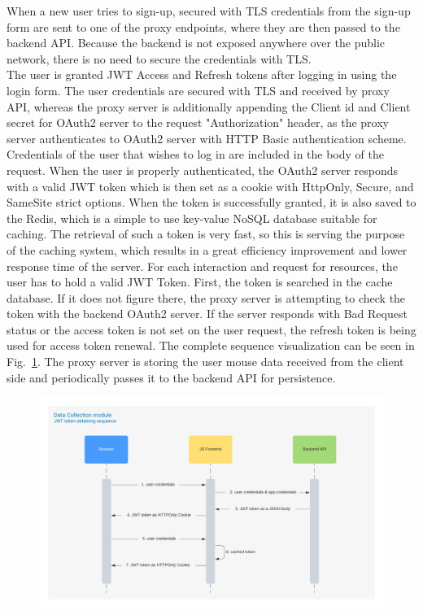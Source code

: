 When a new user tries to sign-up, secured with TLS credentials from the sign-up form are sent to one of the proxy endpoints, where they are then passed to the backend API.
Because the backend is not exposed anywhere over the public network, there is no need to secure the credentials with TLS.\\
The user is granted JWT Access and Refresh tokens after logging in using the login form.
The user credentials are secured with TLS and received by proxy API, whereas the proxy server is additionally appending the Client id and Client secret for OAuth2 server to the request "Authorization" header, as the proxy server authenticates to OAuth2 server with HTTP Basic authentication scheme.
Credentials of the user that wishes to log in are included in the body of the request.
When the user is properly authenticated, the OAuth2 server responds with a valid JWT token which is then set as a cookie with HttpOnly, Secure, and SameSite strict options.
When the token is successfully granted, it is also saved to the Redis, which is a simple to use key-value NoSQL database suitable for caching.
The retrieval of such a token is very fast, so this is serving the purpose of the caching system, which results in a great efficiency improvement and lower response time of the server.
For each interaction and request for resources, the user has to hold a valid JWT Token.
First, the token is searched in the cache database.
If it does not figure there, the proxy server is attempting to check the token with the backend OAuth2 server.
If the server responds with Bad Request status or the access token is not set on the user request, the refresh token is being used for access token renewal.
The complete sequence visualization can be seen in \mbox{Fig.~\ref{fig:jwt-sequence}}.
The proxy server is storing the user mouse data received from the client side and periodically passes it to the backend API for persistence.




\begin{figure}[!hbt]
    
    \centering
    \includegraphics[width=\linewidth]{resources/jwt_sequence_diagram.png}
    \captionsetup{width=\linewidth}
    \label{fig:jwt-sequence}
\end{figure}